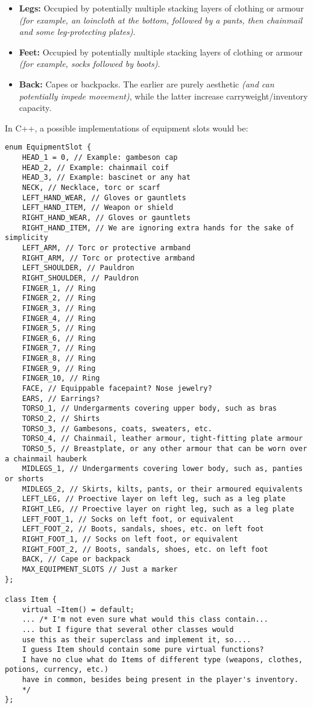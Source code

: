 \documentclass[openany,11pt,a4paper]{book}
\begin{document}
\begin{itemize}
\item \textbf{Legs:} Occupied by potentially multiple stacking layers of clothing or armour \textit{(for example, an loincloth at the bottom, followed by a pants, then chainmail and some leg-protecting plates)}.
\item \textbf{Feet:} Occupied by potentially multiple stacking layers of clothing or armour \textit{(for example, socks followed by boots)}.
\item \textbf{Back:} Capes or backpacks. The earlier are purely aesthetic \textit{(and can potentially impede movement)}, while the latter increase carryweight/inventory capacity.
\end{itemize}
In C++, a possible implementations of equipment slots would be:
\begin{lstlisting}[style=CPPStyle]
enum EquipmentSlot {
	HEAD_1 = 0, // Example: gambeson cap
	HEAD_2, // Example: chainmail coif
	HEAD_3, // Example: bascinet or any hat
	NECK, // Necklace, torc or scarf
	LEFT_HAND_WEAR, // Gloves or gauntlets
	LEFT_HAND_ITEM, // Weapon or shield
	RIGHT_HAND_WEAR, // Gloves or gauntlets
	RIGHT_HAND_ITEM, // We are ignoring extra hands for the sake of simplicity
	LEFT_ARM, // Torc or protective armband
	RIGHT_ARM, // Torc or protective armband
	LEFT_SHOULDER, // Pauldron
	RIGHT_SHOULDER, // Pauldron
	FINGER_1, // Ring
	FINGER_2, // Ring
	FINGER_3, // Ring
	FINGER_4, // Ring
	FINGER_5, // Ring
	FINGER_6, // Ring
	FINGER_7, // Ring
	FINGER_8, // Ring
	FINGER_9, // Ring
	FINGER_10, // Ring
	FACE, // Equippable facepaint? Nose jewelry?
	EARS, // Earrings?
	TORSO_1, // Undergarments covering upper body, such as bras
	TORSO_2, // Shirts
	TORSO_3, // Gambesons, coats, sweaters, etc.
	TORSO_4, // Chainmail, leather armour, tight-fitting plate armour
	TORSO_5, // Breastplate, or any other armour that can be worn over a chainmail hauberk
	MIDLEGS_1, // Undergarments covering lower body, such as, panties or shorts
	MIDLEGS_2, // Skirts, kilts, pants, or their armoured equivalents
	LEFT_LEG, // Proective layer on left leg, such as a leg plate
	RIGHT_LEG, // Proective layer on right leg, such as a leg plate
	LEFT_FOOT_1, // Socks on left foot, or equivalent
	LEFT_FOOT_2, // Boots, sandals, shoes, etc. on left foot
	RIGHT_FOOT_1, // Socks on left foot, or equivalent
	RIGHT_FOOT_2, // Boots, sandals, shoes, etc. on left foot
	BACK, // Cape or backpack
	MAX_EQUIPMENT_SLOTS // Just a marker
};

class Item {
	virtual ~Item() = default;
	... /* I'm not even sure what would this class contain...
	... but I figure that several other classes would
	use this as their superclass and implement it, so....
	I guess Item should contain some pure virtual functions?
	I have no clue what do Items of different type (weapons, clothes, potions, currency, etc.)
	have in common, besides being present in the player's inventory.
	*/
};
\end{lstlisting}
\end{document}
